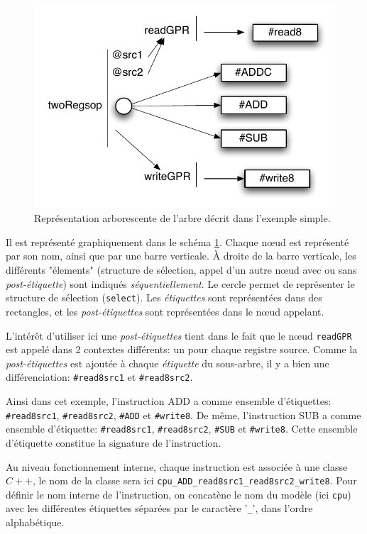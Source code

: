 \begin{figure}		%
  \begin{center}
    \includegraphics[width=0.8 \linewidth]{../common/images/instBase.pdf}
    \caption{Représentation arborescente de l'arbre décrit dans l'exemple simple.}
    \label{fig:instBase}
  \end{center}
\end{figure}

Il est représenté graphiquement dans le schéma \ref{fig:instBase}. Chaque n\oe ud est représenté par son nom, ainsi que par une barre verticale. À droite de la barre verticale, les différents "élements" (structure de sélection, appel d'un autre n\oe ud avec ou sans \emph{post-étiquette}) sont indiqués \emph{séquentiellement}. Le cercle permet de représenter le structure de sélection (\texttt{select}). Les \emph{étiquettes} sont représentées dans des rectangles, et les \emph{post-étiquettes} sont représentées dans le n\oe ud appelant.

L'intérêt d'utiliser ici une \emph{post-étiquettes} tient dans le fait que le n\oe ud \texttt{readGPR} est appelé dans 2 contextes différents: un pour chaque registre source. Comme la \emph{post-étiquettes} est ajoutée à chaque \emph{étiquette} du sous-arbre, il y a bien une différenciation: \texttt{\#read8src1} et \texttt{\#read8src2}.

Ainsi dans cet exemple, l'instruction ADD a comme ensemble d'étiquettes:  \texttt{\#read8src1}, \texttt{\#read8src2}, \texttt{\#ADD} et \texttt{\#write8}. De même, l'instruction SUB a comme ensemble d'étiquette:  \texttt{\#read8src1}, \texttt{\#read8src2}, \texttt{\#SUB} et \texttt{\#write8}. Cette ensemble d'étiquette constitue la signature de l'instruction.

Au niveau fonctionnement interne, chaque instruction est associée à une classe $C++$, le nom de la classe sera ici \texttt{cpu\_ADD\_read8src1\_read8src2\_write8}. Pour définir le nom interne de l'instruction, on concatène le nom du modèle (ici \texttt{cpu}) avec les différentes étiquettes séparées par le caractère '\texttt{\_}', dans l'ordre alphabétique.

